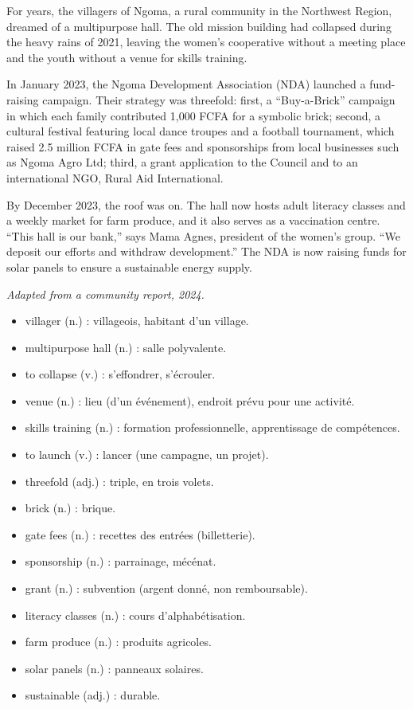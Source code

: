 \documentclass[11pt]{article}
\newcommand{\cle}[1]{{\popxbold\color{popdark}#1}}
\begin{document}
\begin{textebox}
For years, the villagers of Ngoma, a rural community in the Northwest Region, dreamed of a multipurpose hall. The old mission building had collapsed during the heavy rains of 2021, leaving the women's cooperative without a meeting place and the youth without a venue for skills training.

In January 2023, the Ngoma Development Association (NDA) launched a fund-raising campaign. Their strategy was threefold: first, a “Buy-a-Brick” campaign in which each family contributed 1,000 FCFA for a symbolic brick; second, a cultural festival featuring local dance troupes and a football tournament, which raised 2.5 million FCFA in gate fees and sponsorships from local businesses such as Ngoma Agro Ltd; third, a grant application to the Council and to an international NGO, Rural Aid International.

By December 2023, the roof was on. The hall now hosts adult literacy classes and a weekly market for farm produce, and it also serves as a vaccination centre. “This hall is our bank,” says Mama Agnes, president of the women's group. “We deposit our efforts and withdraw development.” The NDA is now raising funds for solar panels to ensure a sustainable energy supply.

\emph{Adapted from a community report, 2024.}
\end{textebox}

\begin{definition}
\begin{itemize}
\item \cle{villager} (n.) : villageois, habitant d'un village.
\item \cle{multipurpose hall} (n.) : salle polyvalente.
\item \cle{to collapse} (v.) : s'effondrer, s'écrouler.
\item \cle{venue} (n.) : lieu (d'un événement), endroit prévu pour une activité.
\item \cle{skills training} (n.) : formation professionnelle, apprentissage de compétences.
\item \cle{to launch} (v.) : lancer (une campagne, un projet).
\item \cle{threefold} (adj.) : triple, en trois volets.
\item \cle{brick} (n.) : brique.
\item \cle{gate fees} (n.) : recettes des entrées (billetterie).
\item \cle{sponsorship} (n.) : parrainage, mécénat.
\item \cle{grant} (n.) : subvention (argent donné, non remboursable).
\item \cle{literacy classes} (n.) : cours d'alphabétisation.
\item \cle{farm produce} (n.) : produits agricoles.
\item \cle{solar panels} (n.) : panneaux solaires.
\item \cle{sustainable} (adj.) : durable.
\end{itemize}
\end{definition}
\end{document}
